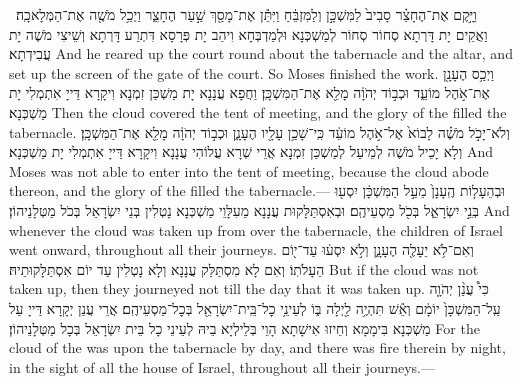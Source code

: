 {וַיָּ֣קֶם אֶת־הֶחָצֵ֗ר סָבִיב֙ לַמִּשְׁכָּ֣ן וְלַמִּזְבֵּ֔חַ וַיִּתֵּ֕ן אֶת־מָסַ֖ךְ שַׁ֣עַר הֶחָצֵ֑ר וַיְכַ֥ל מֹשֶׁ֖ה אֶת־הַמְּלָאכָֽה׃ \petucha }
{וַאֲקֵים יָת דָּרְתָא סְחוֹר סְחוֹר לְמַשְׁכְּנָא וּלְמַדְבְּחָא וִיהַב יָת פְּרָסָא דִּתְרַע דָּרְתָא וְשֵׁיצִי מֹשֶׁה יָת עֲבִידְתָא׃}
{And he reared up the court round about the tabernacle and the altar, and set up the screen of the gate of the court. So Moses finished the work.}{}
{וַיְכַ֥ס הֶעָנָ֖ן אֶת־אֹ֣הֶל מוֹעֵ֑ד וּכְב֣וֹד יְהֹוָ֔ה מָלֵ֖א אֶת־הַמִּשְׁכָּֽן׃}
{וַחֲפָא עֲנָנָא יָת מַשְׁכַּן זִמְנָא וִיקָרָא דַּייָ אִתְמְלִי יָת מַשְׁכְּנָא׃}
{Then the cloud covered the tent of meeting, and the glory of the \lord\space filled the tabernacle.}{}
{וְלֹא־יָכֹ֣ל מֹשֶׁ֗ה לָבוֹא֙ אֶל־אֹ֣הֶל מוֹעֵ֔ד כִּֽי־שָׁכַ֥ן עָלָ֖יו הֶעָנָ֑ן וּכְב֣וֹד יְהֹוָ֔ה מָלֵ֖א אֶת־הַמִּשְׁכָּֽן׃
}
{וְלָא יָכֵיל מֹשֶׁה לְמֵיעַל לְמַשְׁכַּן זִמְנָא אֲרֵי שְׁרָא עֲלוֹהִי עֲנָנָא וִיקָרָא דַּייָ אִתְמְלִי יָת מַשְׁכְּנָא׃}
{And Moses was not able to enter into the tent of meeting, because the cloud abode thereon, and the glory of the \lord\space filled the tabernacle.—}{}
{וּבְהֵעָל֤וֹת הֶֽעָנָן֙ מֵעַ֣ל הַמִּשְׁכָּ֔ן יִסְע֖וּ בְּנֵ֣י יִשְׂרָאֵ֑ל בְּכֹ֖ל מַסְעֵיהֶֽם׃}
{וּבְאִסְתַּלָּקוּת עֲנָנָא מֵעִלָּוֵי מַשְׁכְּנָא נָטְלִין בְּנֵי יִשְׂרָאֵל בְּכֹל מַטְּלָנֵיהוֹן׃}
{And whenever the cloud was taken up from over the tabernacle, the children of Israel went onward, throughout all their journeys.}{}
{וְאִם־לֹ֥א יֵעָלֶ֖ה הֶעָנָ֑ן וְלֹ֣א יִסְע֔וּ עַד־י֖וֹם הֵעָלֹתֽוֹ׃}
{וְאִם לָא מִסְתַּלַּק עֲנָנָא וְלָא נָטְלִין עַד יוֹם אִסְתַּלָּקוּתֵיהּ׃}
{But if the cloud was not taken up, then they journeyed not till the day that it was taken up.}{}
{כִּי֩ עֲנַ֨ן יְהֹוָ֤ה עַֽל־הַמִּשְׁכָּן֙ יוֹמָ֔ם וְאֵ֕שׁ תִּהְיֶ֥ה לַ֖יְלָה בּ֑וֹ לְעֵינֵ֥י כׇל־בֵּֽית־יִשְׂרָאֵ֖ל בְּכׇל־מַסְעֵיהֶֽם׃
}
{אֲרֵי עֲנַן יְקָרָא דַּייָ עַל מַשְׁכְּנָא בִּימָמָא וְחֵיזוּ אִישָׁתָא הָוֵי בְּלֵילְיָא בֵיהּ לְעֵינֵי כָל בֵּית יִשְׂרָאֵל בְּכָל מַטְּלָנֵיהוֹן׃}
{For the cloud of the \lord\space was upon the tabernacle by day, and there was fire therein by night, in the sight of all the house of Israel, throughout all their journeys.—}{}
\newperek
